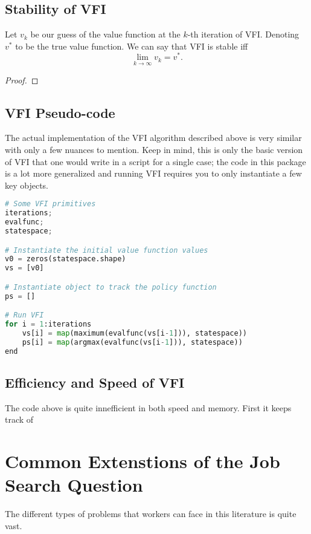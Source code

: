 \documentclass[11pt,english]{article}
\begin{document}
\subsection{Stability of VFI}

Let $v_k$ be our guess of the value function at the $k$-th iteration of VFI. Denoting $v^*$ to be the true value function. We can say that VFI is stable iff $$\lim_{k\to \infty}v_k = v^*.$$
\begin{proof}

\end{proof}



\subsection{VFI Pseudo-code}

The actual implementation of the VFI algorithm described above is very similar with only a few nuances to mention. Keep in mind, this is only the basic version of VFI that one would write in a script for a single case; the code in this package is a lot more generalized and running VFI requires you to only instantiate a few key objects.

\begin{lstlisting}[language = Python]
# Some VFI primitives
iterations;
evalfunc;
statespace;

# Instantiate the initial value function values
v0 = zeros(statespace.shape)
vs = [v0]

# Instantiate object to track the policy function
ps = []

# Run VFI
for i = 1:iterations
	vs[i] = map(maximum(evalfunc(vs[i-1])), statespace))
	ps[i] = map(argmax(evalfunc(vs[i-1])), statespace))
end
\end{lstlisting}


\subsection{Efficiency and Speed of VFI}
The code above is quite innefficient in both speed and memory. First it keeps track of 

\section{Common Extenstions of the Job Search Question}

The different types of problems that workers can face in this literature is quite vast.
\end{document}
